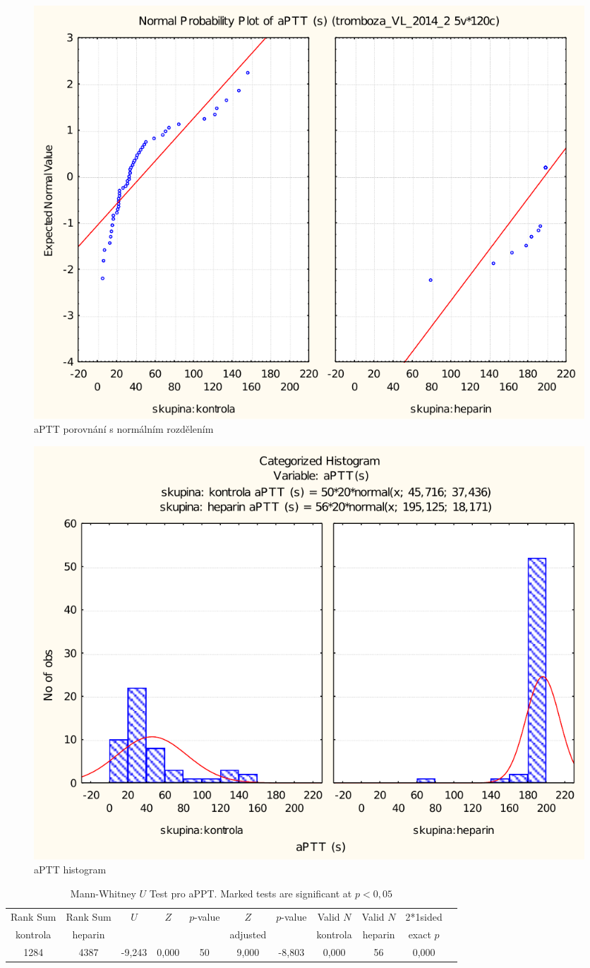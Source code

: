 \documentclass[12pt]{article}
\begin{document}
\begin{figure}[h!]
	\begin{centering}
	\includegraphics[width=0.7\linewidth]{aPTT-prob.pdf}
	\caption{aPTT porovnání s normálním rozdělením}
	\end{centering}
\end{figure}

\begin{figure}[h!]
	\begin{centering}
	\includegraphics[width=0.7\linewidth]{aPTT-hist.pdf}
	\caption{aPTT histogram}
	\end{centering}
\end{figure}

\begin{table}[h!]
\begin{tabular}{|c|c|c|c|c|c|c|c|c|c|c|}
\hline
Rank Sum & Rank Sum & $U$ & $Z$ & $p$-value & $Z$ & $p$-value & Valid $N$ & Valid $N$ & 2*1sided \\
kontrola & heparin & & & & adjusted & & kontrola & heparin & exact $p$ \\
\hline
1284 & 4387 & -9,243 & 0,000 & 50 & 9,000 & -8,803 & 0,000 & 56 & 0,000 \\
\hline
\end{tabular}
\caption{Mann-Whitney $U$ Test pro aPPT. Marked tests are significant at $p < 0,05$}
\end{table}
\end{document}
